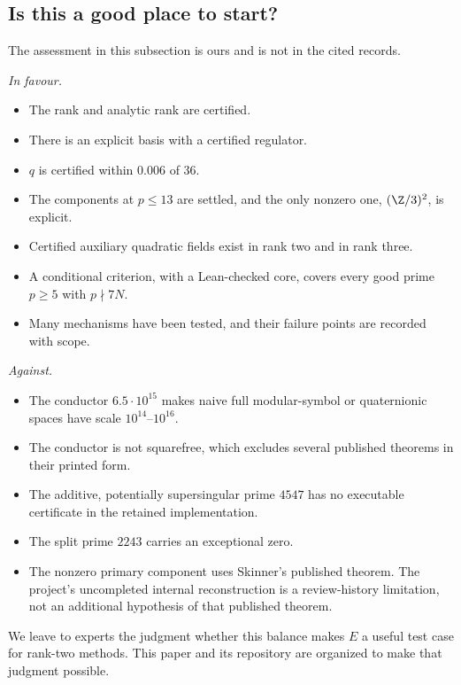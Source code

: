 \subsection{Is this a good place to start?}
The assessment in this subsection is ours and is not in the cited records.

\emph{In favour.}
\begin{itemize}[leftmargin=*]
\item The rank and analytic rank are certified.
\item There is an explicit basis with a certified regulator.
\item $q$ is certified within $0.006$ of $36$.
\item The components at $p\le13$ are settled, and the only nonzero one, $(\Z/3)^2$, is explicit.
\item Certified auxiliary quadratic fields exist in rank two and in rank three.
\item A conditional criterion, with a Lean-checked core, covers every good prime $p\ge5$ with $p\nmid7N$.
\item Many mechanisms have been tested, and their failure points are recorded with scope.
\end{itemize}

\emph{Against.}
\begin{itemize}[leftmargin=*]
\item The conductor $6.5\cdot10^{15}$ makes naive full modular-symbol or quaternionic spaces have scale $10^{14}$--$10^{16}$.
\item The conductor is not squarefree, which excludes several published theorems in their printed form.
\item The additive, potentially supersingular prime $4547$ has no executable certificate in the retained implementation.
\item The split prime $2243$ carries an exceptional zero.
\item The nonzero primary component uses Skinner's published theorem. The project's uncompleted internal reconstruction is a review-history limitation, not an additional hypothesis of that published theorem.
\end{itemize}

We leave to experts the judgment whether this balance makes $E$ a useful test case for rank-two methods. This paper and its repository are organized to make that judgment possible.
